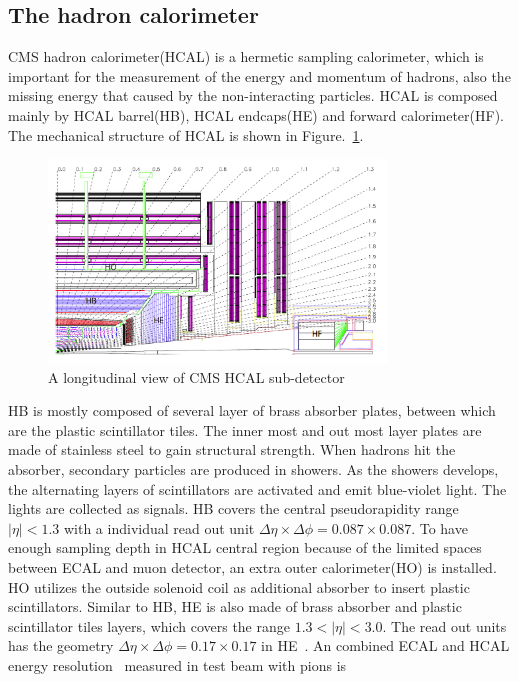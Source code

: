 \subsection{The hadron calorimeter}

CMS hadron calorimeter(HCAL) is a hermetic sampling calorimeter, which is important for the measurement of the energy and momentum of hadrons, also the missing energy that caused by the non-interacting particles.  HCAL is composed mainly by HCAL barrel(HB), HCAL endcaps(HE) and forward calorimeter(HF). The mechanical structure of HCAL is shown in Figure.~\ref{fig:HCALL_sketch}. 

\begin{figure}[htbp] 
\centering
\includegraphics[width=0.8\textwidth]{chapter3/HCAL_sketch.png}
\caption{A longitudinal view of CMS HCAL sub-detector~\cite{CMS_experiment}}
\label{fig:HCALL_sketch}
\end{figure}


HB is mostly composed of  several layer of brass absorber plates, between which are the plastic scintillator tiles. The inner most and out most layer plates are made of stainless steel to gain structural strength. When hadrons hit the absorber, secondary particles are produced in showers. As the showers develops, the alternating layers of scintillators are activated and emit blue-violet light. The lights are collected as signals. HB covers the central pseudorapidity range $|\eta|<1.3$ with a individual read out unit $\Delta \eta\times\Delta\phi=0.087\times 0.087$. To have enough sampling depth in HCAL central region because of the limited spaces between ECAL and muon detector, an extra outer calorimeter(HO) is installed.  HO utilizes the outside solenoid coil as additional absorber to insert plastic scintillators. Similar to HB, HE is also made of brass absorber and plastic scintillator tiles layers, which covers the range $1.3<|\eta|<3.0$. The read out units has the geometry $\Delta \eta\times\Delta\phi=0.17\times 0.17$ in HE~\cite{CMS_experiment}. An combined ECAL and HCAL energy resolution~\cite{HCAL_reso} measured in test beam with pions is 

